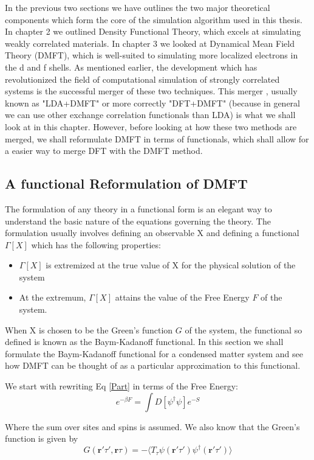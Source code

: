 \documentclass[12pt,letter]{article}
\newcommand{\la}{\langle}
\newcommand{\ra}{\rangle}
\newcommand{\rmb}{\mathbf{r}}
\begin{document}
In the previous two sections we have outlines the two major theoretical components which form the core of the simulation algorithm used in this thesis. In chapter 2 we outlined Density Functional Theory, which excels at simulating weakly correlated materials. In chapter 3 we looked at Dynamical Mean Field Theory (DMFT), which is well-suited to simulating more localized electrons in the d and f shells. As mentioned earlier, the development which has revolutionized the field of computational simulation of strongly correlated systems is the successful merger of these two techniques. This merger , usually known as "LDA+DMFT" or more correctly "DFT+DMFT" (because in general we can use other exchange correlation functionals than LDA) is what we shall look at in this chapter. However, before looking at how these two methods are merged, we shall reformulate DMFT in terms of functionals, which shall allow for a easier way to merge DFT with the DMFT method.

\subsection{A functional Reformulation of DMFT}

The formulation of any theory in a functional form is an elegant way to understand the basic nature of the equations governing the theory. The formulation usually involves defining an observable X and defining a functional $\Gamma[X]$ which has the following properties:
\begin{itemize}
\item $\Gamma[X]$ is extremized at the true value of X for the physical solution of the system
\item At the extremum, $\Gamma[X]$ attains the value of the Free Energy $F$ of the system.
\end{itemize}
 When X is chosen to be the Green's function $G$ of the system, the functional so defined is known as the Baym-Kadanoff functional. In this section we shall formulate the Baym-Kadanoff functional for a condensed matter system and see how DMFT can be thought of as a particular approximation to this functional.
 
We start with rewriting Eq \ref{Part} in terms of the Free Energy:
\begin{equation}
 e^{-\beta F}=\int  D [\psi^\dagger \psi] e^{-S}
\end{equation}

Where the sum over sites and spins is assumed. We also know that the Green's function is given by 
\begin{equation}
G(\rmb' \tau', \rmb \tau) = -\la T_{\tau} \psi(\rmb' \tau') \psi ^\dagger (\rmb' \tau') \ra 
\end{equation}
\end{document}
